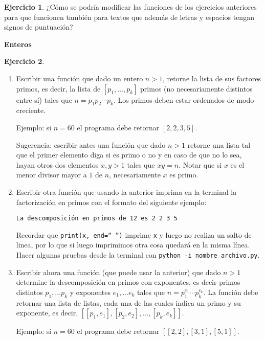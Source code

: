 \documentclass[a4paper,12pt]{book}
\theoremstyle{definition}
\newtheorem{ejercicio}{Ejercicio}
\begin{document}
	\begin{ejercicio}
		¿Cómo se podría modificar las funciones de los ejercicios anteriores para que funcionen también para textos que además de letras y espacios tengan signos de puntuación?
	\end{ejercicio}
	

	\begin{center}
		{\textbf{Enteros}}
	\end{center}
	
	\begin{ejercicio}
		\begin{enumerate}
			\item Escribir una función que dado un entero $n>1$, retorne la lista de sus factores primos, es decir, la lista de $[p_1,\dots,p_k]$ primos (no necesariamente distintos entre sí) tales que $n=p_1p_2\cdots p_k$. Los primos deben estar ordenados de modo creciente.
			
			Ejemplo: si $n=60$ el programa debe retornar $[2,2,3,5]$.
			
			Sugerencia: escribir antes una función que dado $n>1$ retorne una lista tal que el primer elemento diga si es primo o no y en caso de que no lo sea, hayan otros dos elementos $x,y>1$ tales que $xy=n$. Notar que si $x$ es el menor divisor mayor a $1$ de $n$, necesariamente $x$ es primo.
			
			\item Escribir otra función que usando la anterior imprima en la terminal la factorización en primos con el formato del siguiente ejemplo:
			\begin{center}
				{\tt La descomposición en primos de 12 es 2 2 3 5}
			\end{center}
				
				
			Recordar que {\tt print(x, end=`` '')} imprime {\tt x} y luego no realiza un salto de linea, por lo que si luego imprimimos otra cosa quedará en la misma línea.
			Hacer algunas pruebas desde la terminal con {\tt python -i nombre\_archivo.py}.
			
			\item Escribir ahora una función (que puede usar la anterior) que dado $n>1$ determine la descomposición en primos con exponentes, es decir primos distintos $p_1,\dots p_k$ y exponentes $e_1,\dots e_k$ tales que $n=p_1^{e_1}\cdots p_k^{e_k}$. La función debe retornar una lista de listas, cada una de las cuales indica un primo y su exponente, es decir, $[[p_1,e_1],[p_2,e_2],\dots,[p_k,e_k]]$.
			
			Ejemplo: si $n=60$ el programa debe retornar $[[2,2],[3,1],[5,1]]$.
			

\end{enumerate}
\end{ejercicio}
\end{document}
